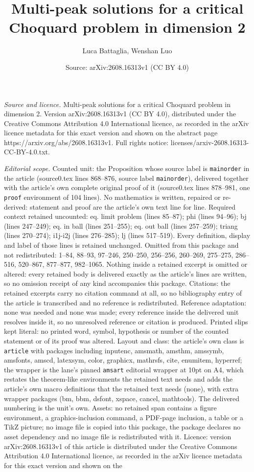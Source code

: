 \documentclass[10pt,a4paper]{amsart}
\title[Multi-peak solutions for a critical Choquard problem in dime]{Multi-peak solutions for a critical Choquard problem in dimension 2}
\author{Luca Battaglia, Wenshan Luo}
\date{Source: arXiv:2608.16313v1 (CC BY 4.0)}
\begin{document}
\maketitle

\noindent\emph{Source and licence.} Multi-peak solutions for a critical Choquard problem in dimension 2. Version arXiv:2608.16313v1 (CC BY 4.0), distributed under the Creative Commons Attribution 4.0 International licence, as recorded in the arXiv licence metadata for this exact version and shown on the abstract page https://arxiv.org/abs/2608.16313v1. Full rights notice: licenses/arxiv-2608.16313-CC-BY-4.0.txt.\par\smallskip

\noindent\textit{Editorial scope.} Counted unit: the Proposition whose source label is \texttt{mainorder} in the article (source0.tex lines 868--876, source label \texttt{mainorder}), delivered together with the article's own complete original proof of it (source0.tex lines 878--981, one \texttt{proof} environment of 104 lines). No mathematics is written, repaired or re-derived: statement and proof are the article's own text line for line. Required context retained uncounted: eq. limit problem (lines 85--87); phi (lines 94--96); bj (lines 247--249); eq. in ball (lines 251--255); eq. out ball (lines 257--259); triang (lines 270--274); i1j-i2j (lines 276--285); lj (lines 517--519). Every definition, display and label of those lines is retained unchanged. Omitted from this package and not redistributed: 1--84, 88--93, 97--246, 250--250, 256--256, 260--269, 275--275, 286--516, 520--867, 877--877, 982--1065. Nothing inside a retained excerpt is omitted or altered: every retained body is delivered exactly as the article's lines are written, so no omission receipt of any kind accompanies this package. Citations: the retained excerpts carry no citation command at all, so no bibliography entry of the article is transcribed and no reference is redistributed. Reference adaptation: none was needed and none was made; every reference inside the delivered unit resolves inside it, so no unresolved reference or citation is produced. Printed slips kept literal: no printed word, symbol, hypothesis or number of the counted statement or of its proof was altered. Layout and class: the article's own class is \texttt{article} with packages including inputenc, amsmath, amsthm, amssymb, amsfonts, amscd, latexsym, color, graphicx, mathrsfs, cite, enumitem, hyperref; the wrapper is the lane's pinned \texttt{amsart} editorial wrapper at 10pt on A4, which restates the theorem-like environments the retained text needs and adds the article's own macro definitions that the retained text needs (none), with extra wrapper packages (bm, bbm, dsfont, xspace, cancel, mathtools). The delivered numbering is the unit's own. Assets: no retained span contains a figure environment, a graphics-inclusion command, a PDF-page inclusion, a table or a TikZ picture; no image file is copied into this package, the package declares no asset dependency and no image file is redistributed with it. Licence: version arXiv:2608.16313v1 of this article is distributed under the Creative Commons Attribution 4.0 International licence, as recorded in the arXiv licence metadata for this exact version and shown on the 
\end{document}
